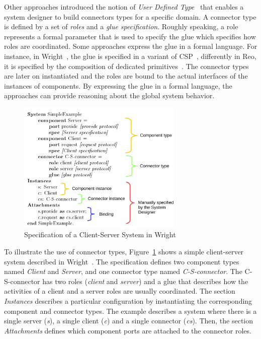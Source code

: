 Other approaches introduced the notion of \emph{User Defined Type}~\cite{uniconbib,wrightbib,reobib} that enables a system designer to build connectors types for a specific domain. A connector type is defined by a set of \emph{roles} and a \emph{glue specification}. Roughly speaking, a role represents a formal parameter that is used to specify the glue which specifies how roles are coordinated. Some approaches express the glue in a formal language. For instance, in Wright~\cite{wrightbib}, the glue is specified in a variant of CSP~\cite{csphoarebib}, differently in Reo, it is specified by the composition of dedicated primitives~\cite{reobib}. The connector types are later on instantiated and the roles are bound to the actual interfaces of the instances of components. By expressing the glue in a formal language, the approaches can provide reasoning about the global system behavior. 

\begin{figure}
	\begin{center}
		\includegraphics[width=0.7\textwidth]{background/figs/wrightspec}
		\caption{Specification of a Client-Server System in Wright~\cite{wrightbib}}
		\label{fig:wrightspec}
	\end{center}
\end{figure}

To illustrate the use of connector types, Figure~\ref{fig:wrightspec} shows a simple client-server system described in Wright~\cite{wrightbib}. The specification defines two component types named \emph{Client} and \emph{Server}, and one connector type named \emph{C-S-connector}. The C-S-connector has two roles (\emph{client} and \emph{server}) and a glue that describes how the activities of a client and a server roles are usually coordinated. The section \emph{Instances} describes a particular configuration by instantiating the corresponding component and connector types. The example describes a system where there is a single server (\emph{s}), a single client (\emph{c}) and a single connector (\emph{cs}). Then, the section \emph{Attachments} defines which component ports are attached to the connector roles.


